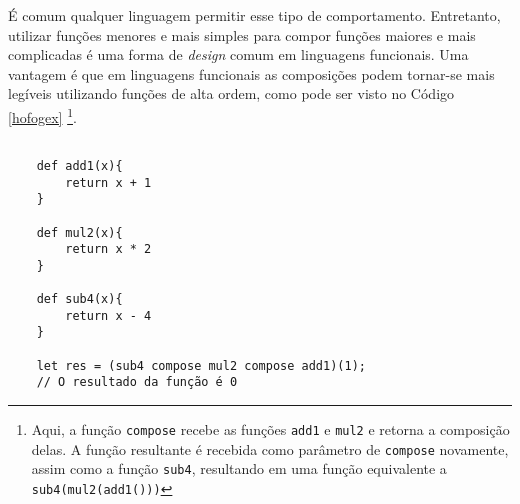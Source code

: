 É comum qualquer linguagem permitir esse tipo 
de comportamento. Entretanto, 
utilizar funções menores e mais simples para compor 
funções maiores e mais complicadas é uma forma de 
\textit{design} comum em linguagens funcionais. Uma vantagem é 
que em linguagens funcionais as composições podem 
tornar-se mais legíveis utilizando funções 
de alta ordem, como pode ser visto no Código 
\ref{hofogex} \footnote{Aqui, a função \texttt{compose} 
recebe as funções \texttt{add1} e \texttt{mul2} e retorna a 
composição delas. A função resultante 
é recebida como parâmetro de \texttt{compose} novamente, 
assim como a função \texttt{sub4}, resultando em uma função 
equivalente a \texttt{sub4(mul2(add1()))}}.

\begin{lstlisting}[caption={Exemplo de Composição de Funções.},label=hofogex]

    def add1(x){
        return x + 1
    }

    def mul2(x){
        return x * 2
    }

    def sub4(x){
        return x - 4
    }

    let res = (sub4 compose mul2 compose add1)(1);
    // O resultado da função é 0

\end{lstlisting}
